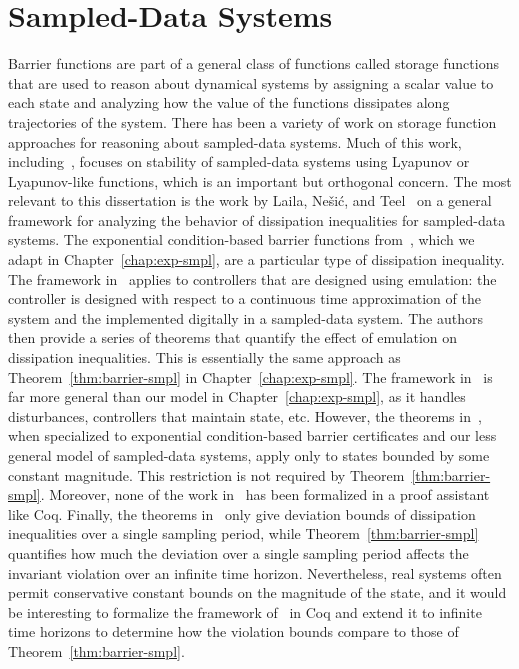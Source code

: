 \section{Sampled-Data Systems}
\label{sec:related-sampled}
Barrier functions are part of a general class of functions called storage
functions~\cite{Willems1972} that are used to reason about dynamical
systems by assigning a scalar value to each state and analyzing how the
value of the functions dissipates along trajectories of the system.  There
has been a variety of work on storage function approaches for reasoning
about sampled-data systems.  Much of this work,
including~\cite{chen1991input,seuret13sampled}, focuses on stability of
sampled-data systems using Lyapunov or Lyapunov-like functions, which is an
important but orthogonal concern. The most relevant to this dissertation is
the work by Laila, Ne\v si\'c, and Teel~\cite{laila02sampled} on a
general framework for analyzing the behavior of dissipation inequalities
for sampled-data systems. The exponential condition-based barrier functions
from~\cite{kong2013barrier}, which we adapt in Chapter~\ref{chap:exp-smpl},
are a particular type of dissipation inequality. The framework
in~\cite{laila02sampled} applies to controllers that are designed using
emulation: the controller is designed with respect to a continuous time
approximation of the system and the implemented digitally in a sampled-data
system. The authors then provide a series of theorems that quantify the
effect of emulation on dissipation inequalities. This is essentially the
same approach as Theorem~\ref{thm:barrier-smpl} in
Chapter~\ref{chap:exp-smpl}. The framework in~\cite{laila02sampled} is far
more general than our model in Chapter~\ref{chap:exp-smpl}, as it handles
disturbances, controllers that maintain state, etc. However, the theorems
in~\cite{laila02sampled}, when specialized to exponential condition-based
barrier certificates and our less general model of sampled-data systems,
apply only to states bounded by some constant magnitude. This restriction
is not required by Theorem~\ref{thm:barrier-smpl}. Moreover, none of the
work in~\cite{laila02sampled} has been formalized in a proof assistant like
Coq. Finally, the theorems in~\cite{laila02sampled} only give deviation
bounds of dissipation inequalities over a single sampling period, while
Theorem~\ref{thm:barrier-smpl} quantifies how much the deviation over a
single sampling period affects the invariant violation over an infinite
time horizon. Nevertheless, real systems often permit conservative constant
bounds on the magnitude of the state, and it would be interesting to
formalize the framework of~\cite{laila02sampled} in Coq and extend it to
infinite time horizons to determine how the violation bounds compare to
those of Theorem~\ref{thm:barrier-smpl}.

